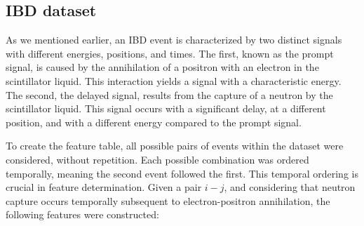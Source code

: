 \subsection{IBD dataset}
As we mentioned earlier, an IBD event is characterized by two distinct signals with different energies, positions, and times. The first, known as the prompt signal, is caused by the annihilation of a positron with an electron in the scintillator liquid. This interaction yields a signal with a characteristic energy. The second, the delayed signal, results from the capture of a neutron by the scintillator liquid. This signal occurs with a significant delay, at a different position, and with a different energy compared to the prompt signal.

To create the feature table, all possible pairs of events within the dataset were considered, without repetition. Each possible combination was ordered temporally, meaning the second event followed the first. This temporal ordering is crucial in feature determination. Given a pair $i-j$, and considering that neutron capture occurs temporally subsequent to electron-positron annihilation, the following features were constructed:


